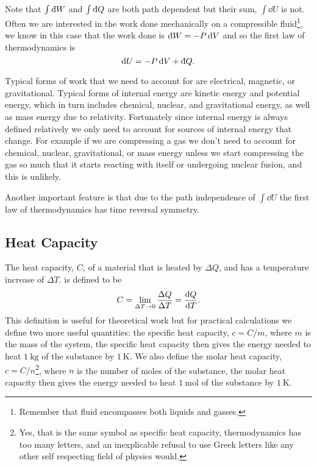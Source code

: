     Note that \(\int\ddbar{W}\) and \(\int\ddbar{Q}\) are both path dependent but their sum, \(\int\dd{U}\) is not.
    Often we are interested in the work done mechanically on a compressible fluid\footnote{Remember that fluid encompasses both liquids and gasses.}, we know in this case that the work done is \(\ddbar{W} = -P\dd{V}\) and so the first law of thermodynamics is
    \[\dd{U} = -P\dd{V} + \ddbar{Q}.\]
    
    Typical forms of work that we need to account for are electrical, magnetic, or gravitational.
    Typical forms of internal energy are kinetic energy and potential energy, which in turn includes chemical, nuclear, and gravitational energy, as well as mass energy due to relativity.
    Fortunately since internal energy is always defined relatively we only need to account for sources of internal energy that change.
    For example if we are compressing a gas we don't need to account for chemical, nuclear, gravitational, or mass energy unless we start compressing the gas so much that it starts reacting with itself or undergoing nuclear fusion, and this is unlikely.
    
    Another important feature is that due to the path independence of \(\int\dd{U}\) the first law of thermodynamics has time reversal symmetry.
    
    \subsection{Heat Capacity}
    The heat capacity, \(C\), of a material that is heated by \(\Delta Q\), and has a temperature increase of \(\Delta T\). is defined to be
    \[C = \lim_{\Delta T\to 0} \frac{\Delta Q}{\Delta T} = \dv{Q}{T}.\]
    This definition is useful for theoretical work but for practical calculations we define two more useful quantities: the specific heat capacity, \(c = C/m\),  where \(m\) is the mass of the system, the specific heat capacity then gives the energy needed to heat \(\SI{1}{\kilogram}\) of the substance by \(\SI{1}{\kelvin}\).
    We also define the molar heat capacity, \(c = C/n\)\footnote{Yes, that is the same symbol as specific heat capacity, thermodynamics has too many letters, and an inexplicable refusal to use Greek letters like any other self respecting field of physics would.}, where \(n\) is the number of moles of the substance, the molar heat capacity then gives the energy needed to heat \(\SI{1}{\mole}\) of the substance by \(\SI{1}{\kelvin}\).
    
